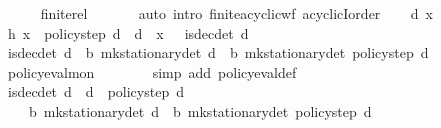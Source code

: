 \begin{isabellebody}
\ \ \ \ \isamarkupfalse%
\ finite{\isacharunderscore}{\kern0pt}rel\ \isanewline
\ \ \ \ \isamarkupfalse%
\ {\isacharparenleft}{\kern0pt}auto\ intro{\isacharbang}{\kern0pt}{\isacharcolon}{\kern0pt}\ finite{\isacharunderscore}{\kern0pt}acyclic{\isacharunderscore}{\kern0pt}wf\ acyclicI{\isacharunderscore}{\kern0pt}order{\isacharparenright}{\kern0pt}\isanewline
{}\isamarkupfalse%
\isanewline
\ \ \isamarkupfalse%
\ d\ x\isanewline
\ \ \isamarkupfalse%
\ h{\isacharcolon}{\kern0pt}\ {\isachardoublequoteopen}x\ {\isacharequal}{\kern0pt}\ policy{\isacharunderscore}{\kern0pt}step\ d{\isachardoublequoteclose}\ {\isachardoublequoteopen}{\isasymnot}\ {\isacharparenleft}{\kern0pt}d\ {\isacharequal}{\kern0pt}\ x\ {\isasymor}\ {\isasymnot}\ is{\isacharunderscore}{\kern0pt}dec{\isacharunderscore}{\kern0pt}det\ d{\isacharparenright}{\kern0pt}{\isachardoublequoteclose}\isanewline
\ \ \isamarkupfalse%
\ {\isachardoublequoteopen}is{\isacharunderscore}{\kern0pt}dec{\isacharunderscore}{\kern0pt}det\ d\ {\isasymLongrightarrow}\ {\isasymnu}\isactrlsub b\ {\isacharparenleft}{\kern0pt}mk{\isacharunderscore}{\kern0pt}stationary{\isacharunderscore}{\kern0pt}det\ d{\isacharparenright}{\kern0pt}\ {\isasymle}\ {\isasymnu}\isactrlsub b\ {\isacharparenleft}{\kern0pt}mk{\isacharunderscore}{\kern0pt}stationary{\isacharunderscore}{\kern0pt}det\ {\isacharparenleft}{\kern0pt}policy{\isacharunderscore}{\kern0pt}step\ d{\isacharparenright}{\kern0pt}{\isacharparenright}{\kern0pt}{\isachardoublequoteclose}\isanewline
\ \ \ \ \isamarkupfalse%
\ policy{\isacharunderscore}{\kern0pt}eval{\isacharunderscore}{\kern0pt}mon\ \ \isanewline
\ \ \ \ \isamarkupfalse%
\ {\isacharparenleft}{\kern0pt}simp\ add{\isacharcolon}{\kern0pt}\ policy{\isacharunderscore}{\kern0pt}eval{\isacharunderscore}{\kern0pt}def{\isacharparenright}{\kern0pt}\isanewline
\ \ \isamarkupfalse%
\ {\isachardoublequoteopen}is{\isacharunderscore}{\kern0pt}dec{\isacharunderscore}{\kern0pt}det\ d\ {\isasymLongrightarrow}\ d\ {\isasymnoteq}\ policy{\isacharunderscore}{\kern0pt}step\ d\ {\isasymLongrightarrow}\isanewline
\ \ \ \ {\isasymnu}\isactrlsub b\ {\isacharparenleft}{\kern0pt}mk{\isacharunderscore}{\kern0pt}stationary{\isacharunderscore}{\kern0pt}det\ d{\isacharparenright}{\kern0pt}\ {\isacharless}{\kern0pt}\ {\isasymnu}\isactrlsub b\ {\isacharparenleft}{\kern0pt}mk{\isacharunderscore}{\kern0pt}stationary{\isacharunderscore}{\kern0pt}det\ {\isacharparenleft}{\kern0pt}policy{\isacharunderscore}{\kern0pt}step\ d{\isacharparenright}{\kern0pt}{\isacharparenright}{\kern0pt}{\isachardoublequoteclose}\isanewline

\end{isabellebody}
